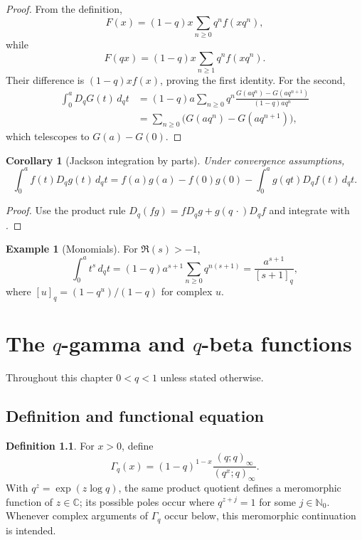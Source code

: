 \documentclass[11pt,oneside,openany]{book}
\newtheorem{corollary}[corollary]{Corollary}
\theoremstyle{definition}
\newtheorem{definition}[definition]{Definition}
\newtheorem{example}[example]{Example}
\theoremstyle{remark}
\newcommand{\C}{\mathbb C}
\newcommand{\N}{\mathbb N}
\begin{document}
\begin{proof}
From the definition,
\[
 F(x)=(1-q)x\sum_{n\ge0}q^nf(xq^n),
\]
while
\[
 F(qx)=(1-q)x\sum_{n\ge1}q^nf(xq^n).
\]
Their difference is $(1-q)xf(x)$, proving the first identity.  For the second,
\begin{align*}
 \int_0^aD_qG(t)\,d_qt
 &=(1-q)a\sum_{n\ge0}q^n
 \frac{G(aq^n)-G(aq^{n+1})}{(1-q)aq^n}\\
 &=\sum_{n\ge0}\bigl(G(aq^n)-G(aq^{n+1})\bigr),
\end{align*}
which telescopes to $G(a)-G(0)$.
\end{proof}

\begin{corollary}[Jackson integration by parts]\label{cor:q-integration-parts}
Under convergence assumptions,
\[
 \int_0^a f(t)D_qg(t)\,d_qt
 =f(a)g(a)-f(0)g(0)
 -\int_0^a g(qt)D_qf(t)\,d_qt.
\]
\end{corollary}

\begin{proof}
Use the product rule
\(
 D_q(fg)=fD_qg+g(q\,\cdot)D_qf
\)
and integrate with .
\end{proof}

\begin{example}[Monomials]
For $\Re(s)>-1$,
\[
 \int_0^a t^s\,d_qt
 =(1-q)a^{s+1}\sum_{n\ge0}q^{n(s+1)}
 =\frac{a^{s+1}}{[s+1]_q},
\]
where $[u]_q=(1-q^u)/(1-q)$ for complex $u$.
\end{example}

\chapter{The \texorpdfstring{$q$}{q}-gamma and \texorpdfstring{$q$}{q}-beta functions}\label{chap:qgamma}

Throughout this chapter $0<q<1$ unless stated otherwise.

\section{Definition and functional equation}

\begin{definition}
For $x>0$, define
\[
 \Gamma_q(x)
 =(1-q)^{1-x}\frac{(q;q)_\infty}{(q^x;q)_\infty}.
\]
With $q^z=\exp(z\log q)$, the same product quotient defines a
meromorphic function of $z\in\C$; its possible poles occur where
$q^{z+j}=1$ for some $j\in\N_0$.  Whenever complex arguments of
$\Gamma_q$ occur below, this meromorphic continuation is intended.
\end{definition}
\end{document}
